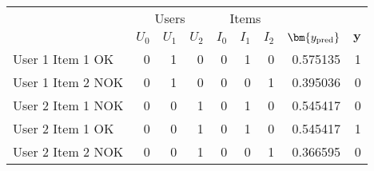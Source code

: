 \begin{tabular}{lrrrrrrrr}
\toprule
& \multicolumn{3}{c}{Users} & \multicolumn{3}{c}{Items}\\
\cmidrule{2-4} \cmidrule{5-7}
{} &  $U_0$ &  $U_1$ &  $U_2$ &  $I_0$ &  $I_1$ &  $I_2$ &    $\bm{y_{\textnormal{pred}}}$ &  $\bm{y}$ \\
\midrule
User 1 Item 1 OK  &  0 &  1 &  0 &  0 &  1 &  0 &  0.575135 &      1 \\
User 1 Item 2 NOK &  0 &  1 &  0 &  0 &  0 &  1 &  0.395036 &      0 \\
User 2 Item 1 \alert{NOK} &  0 &  0 &  1 &  0 &  1 &  0 &  \alert{0.545417} &      \alert0 \\
User 2 Item 1 \alert{OK}  &  0 &  0 &  1 &  0 &  1 &  0 &  \alert{0.545417} &      \alert1 \\
User 2 Item 2 NOK &  0 &  0 &  1 &  0 &  0 &  1 &  0.366595 &      0 \\
\bottomrule
\end{tabular}
